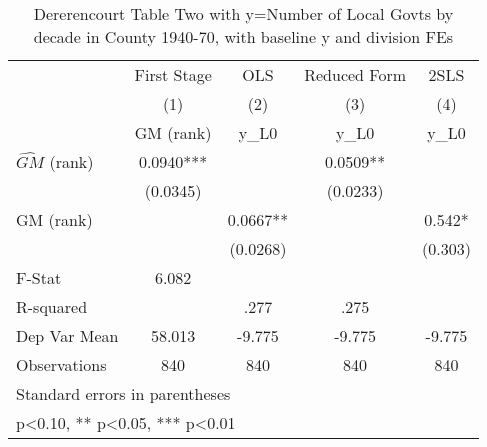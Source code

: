 \begin{table}[htbp]\centering
\def\sym#1{\ifmmode^{#1}\else\(^{#1}\)\fi}
\caption{Dererencourt Table Two with y=Number of Local Govts by decade in County 1940-70, with baseline y and division FEs}
\begin{tabular}{l*{4}{c}}
\toprule
                    & First Stage   &         OLS   &Reduced Form   &        2SLS   \\
                    &\multicolumn{1}{c}{(1)}&\multicolumn{1}{c}{(2)}&\multicolumn{1}{c}{(3)}&\multicolumn{1}{c}{(4)}\\
                    &\multicolumn{1}{c}{GM  (rank)}&\multicolumn{1}{c}{y\_L0}&\multicolumn{1}{c}{y\_L0}&\multicolumn{1}{c}{y\_L0}\\
\midrule
$\hat{GM}$ (rank)   &      0.0940***&               &      0.0509** &               \\
                    &    (0.0345)   &               &    (0.0233)   &               \\
\addlinespace
GM  (rank)          &               &      0.0667** &               &       0.542*  \\
                    &               &    (0.0268)   &               &     (0.303)   \\
\midrule
F-Stat              &       6.082   &               &               &               \\
R-squared           &               &        .277   &        .275   &               \\
Dep Var Mean        &      58.013   &      -9.775   &      -9.775   &      -9.775   \\
Observations        &         840   &         840   &         840   &         840   \\
\bottomrule
\multicolumn{5}{l}{\footnotesize Standard errors in parentheses}\\
\multicolumn{5}{l}{\footnotesize * p<0.10, ** p<0.05, *** p<0.01}\\
\end{tabular}
\end{table}

